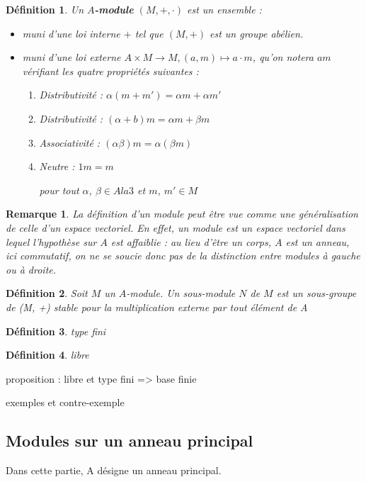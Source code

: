 \documentclass[a4paper,12pt]{report}  %
\theoremstyle{definitionstyle}
\newtheorem{definition}{Définition}[chapter] %
\theoremstyle{examplestyle}
\theoremstyle{remarkstyle}
\newtheorem{remark}{Remarque}[chapter] %
\begin{document}
	\begin{definition}
		Un \textbf{$A$-module} $(M, +, \cdot)$ est un ensemble :
		
		\begin{itemize}
			\item muni d'une loi interne $+$ tel que $(M, +)$ est un groupe abélien.
			\item muni d'une loi externe $A \times M \rightarrow M, (a, m) \mapsto a \cdot m$, qu'on notera $am$ vérifiant les quatre propriétés suivantes :
			\begin{enumerate}
				\item Distributivité : $\alpha(m + m') = \alpha m + \alpha m'$
				\item Distributivité : $(\alpha+b)m = \alpha m + \beta m$
				\item Associativité : $(\alpha \beta)m = \alpha(\beta m)$
				\item Neutre : $1m = m$
				
				pour tout $\alpha$, $\beta \in Ala 3$ et $m$, $m' \in M$
			\end{enumerate}
		\end{itemize}
	\end{definition}
	
	\begin{remark}
		La définition d'un module peut être vue comme une généralisation de celle d'un espace vectoriel. En effet, un module est un espace vectoriel dans lequel l'hypothèse sur $A$ est affaiblie : au lieu d'être un corps, $A$ est un anneau, ici commutatif, on ne se soucie donc pas de la distinction entre modules à gauche ou à droite.
	\end{remark}
	
	\begin{definition}
		Soit $M$ un $A$-module. Un sous-module $N$ de $M$ est un sous-groupe de (M, +) stable pour la multiplication externe par tout élément de A
	\end{definition}
	
	
	\begin{definition}
		type fini
	\end{definition}

	\begin{definition}
		libre
	\end{definition}


	proposition : libre et type fini => base finie
	
	exemples et contre-exemple
	
	
	
	\subsection{Modules sur un anneau principal}
	Dans cette partie, A désigne un anneau principal.
	
	

	
	\printbibliography
	
\end{document}
